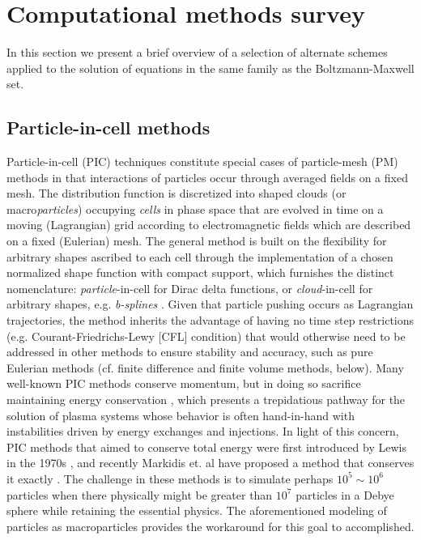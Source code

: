 \documentclass[11pt,titlepage]{report}
\begin{document}




\section{Computational methods survey}

\indent \indent In this section we present a brief overview of a selection of alternate schemes applied to the solution of equations in the same family as the Boltzmann-Maxwell set.



\subsection*{Particle-in-cell methods}

\indent \indent Particle-in-cell (PIC) techniques constitute special cases of particle-mesh (PM) methods in that interactions of particles occur through averaged fields on a fixed mesh. The distribution function is discretized into shaped clouds (or macro\emph{particles}) occupying \emph{cells} in phase space that are evolved in time on a moving (Lagrangian) grid according to electromagnetic fields which are described on a fixed (Eulerian) mesh. The general method is built on the flexibility for arbitrary shapes ascribed to each cell through the implementation of a chosen normalized shape function with compact support, which furnishes the distinct nomenclature: \emph{particle}-in-cell for Dirac delta functions, or \emph{cloud}-in-cell for arbitrary shapes, e.g. \emph{b-splines} \cite{Lapenta}. Given that particle pushing occurs as Lagrangian trajectories, the method inherits the advantage of having no time step restrictions (e.g. Courant-Friedrichs-Lewy [CFL] condition) that would otherwise need to be addressed in other methods to ensure stability and accuracy, such as pure Eulerian methods (cf. finite difference and finite volume methods, below). Many well-known PIC methods conserve momentum, but in doing so sacrifice maintaining energy conservation \cite{Birdsall, Hockney}, which presents a trepidatious pathway for the solution of plasma systems whose behavior is often hand-in-hand with instabilities driven by energy exchanges and injections. In light of this concern, PIC methods that aimed to conserve total energy were first introduced by Lewis in the 1970s \cite{Lewis70}, and recently Markidis et. al have proposed a method that conserves it exactly \cite{Markidis11}. The challenge in these methods is to simulate perhaps $10^5 \sim 10^6$ particles when there physically might be greater than $10^7$ particles in a Debye sphere while retaining the essential physics. The aforementioned modeling of particles as macroparticles provides the workaround for this goal to accomplished.
\end{document}
